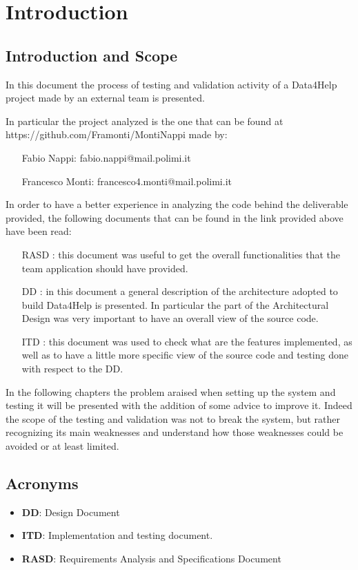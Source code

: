 \section{Introduction}

\subsection{Introduction and Scope}

In this document the process of testing and validation activity of a Data4Help project made by an external team is presented.

In particular the project analyzed is the one that can be found at
https://github.com/Framonti/MontiNappi made by:
\begin{itemize}
\item[] Fabio Nappi: fabio.nappi@mail.polimi.it
\item[] Francesco Monti: francesco4.monti@mail.polimi.it
\end{itemize}

In order to have a better experience in analyzing the code behind the deliverable provided, the following documents that can be found in the link provided above have been read:
\begin{itemize}
\item[RASD]: this document was useful to get the overall functionalities that the team application should have provided.
\item[DD]: in this document a general description of the architecture adopted to build Data4Help is presented. In particular the part of the Architectural Design was very important to have an overall view of the source code.
\item[ITD]: this document was used to check what are the features implemented, as well as to have a little more specific view of the source code and testing done with respect to the DD.
\end{itemize}


In the following chapters the problem araised when setting up the system and testing it will be presented with the addition of some advice to improve it. 
Indeed the scope of the testing and validation was not to break the system, but rather recognizing its main weaknesses and understand how those weaknesses could be avoided or at least limited. 


\subsection{Acronyms}
\begin{itemize}
\item \textbf{DD}: Design Document
\item \textbf{ITD}: Implementation and testing document.
\item \textbf{RASD}: Requirements Analysis and Specifications Document
\end{itemize}



